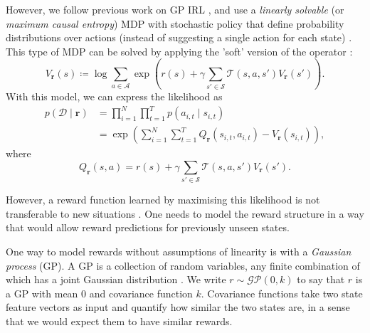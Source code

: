 \documentclass{mpaper}
\newcommand{\V}{V_{\mathbf{r}}}
\begin{document}
However, we follow previous work on GP IRL
\cite{DBLP:conf/nips/LevinePK11,DBLP:conf/uai/JinDAS17}, and use a
\emph{linearly solvable} (or \emph{maximum causal entropy}) MDP with stochastic
policy that define probability distributions over actions (instead of
suggesting a single action for each state) \cite{ziebart2008maximum}. This type
of MDP can be solved by applying the 'soft' version of the operator
\cite{DBLP:conf/nips/LevinePK11,supplementary_material}:
\begin{equation} \label{eq:update_rule}
  \V(s) \coloneqq \log \sum_{a \in \mathcal{A}} \exp\left( r(s) + \gamma\sum_{s'
      \in \mathcal{S}} \mathcal{T}(s, a, s')\V(s') \right).
\end{equation}
With this model, we can express the likelihood as
\cite{DBLP:conf/uai/JinDAS17,DBLP:conf/nips/LevinePK11}
\begin{equation} \label{pDr}
  \begin{split}
    p(\mathcal{D} \mid \mathbf{r}) &= \prod_{i=1}^N \prod_{t=1}^T p(a_{i,t} \mid s_{i,t}) \\
    &= \exp\left( \sum_{i=1}^N \sum_{t=1}^T Q_{\mathbf{r}}(s_{i,t}, a_{i,t}) - \V(s_{i,t}) \right),
  \end{split}
\end{equation}
where
\[
  Q_{\mathbf{r}}(s, a) = r(s) + \gamma\sum_{s' \in \mathcal{S}}
  \mathcal{T}(s, a, s')\V(s').
\]

However, a reward function learned by maximising this likelihood is not
transferable to new situations
\cite{DBLP:conf/uai/JinDAS17,DBLP:conf/nips/LevinePK11}. One needs to model the
reward structure in a way that would allow reward predictions for previously
unseen states.

One way to model rewards without assumptions of linearity is with a
\emph{Gaussian process} (GP). A GP is a collection of random variables, any
finite combination of which has a joint Gaussian distribution
\cite{DBLP:books/lib/RasmussenW06}. We write $r \sim \mathcal{GP}(0,
k)$ to say that $r$ is a GP with mean $0$ and covariance function
$k$. Covariance functions take two state feature vectors as input and quantify
how similar the two states are, in a sense that we would expect them to have
similar rewards.
\end{document}
